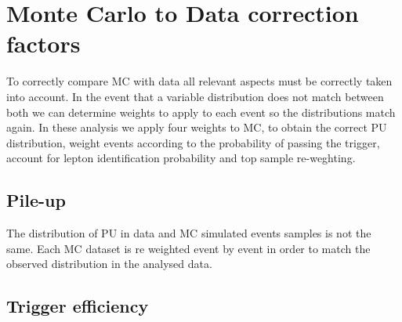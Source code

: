 \section{Monte Carlo to Data correction factors}


To correctly compare \gls{MC} with data all relevant aspects must be correctly taken into account. In the event that a variable distribution does not match between both we can determine weights to apply to each event so the distributions match again. In these analysis we apply four weights to \gls{MC}, to obtain the correct \gls{PU} distribution, weight events according to the probability of passing the trigger, account for lepton identification probability and top sample re-weghting.

\subsection{Pile-up}


The distribution of \gls{PU} in data and \gls{MC} simulated events samples is not the same. Each \gls{MC} dataset is re weighted event by event in order to match the observed distribution in the analysed data.

\subsection{Trigger efficiency}
\label{SUBSECTION:ParkedDataAnalysis_CorrectionFactors_TriggerEfficiency}

